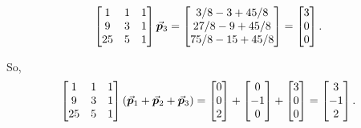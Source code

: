 \documentclass[MathsNotesBase.tex]{subfiles}
\begin{document}
{\begin{itemize}
{\[				\begin{bmatrix}
				1 & 1 & 1\\
				9 & 3 & 1\\
				25 & 5 & 1
				\end{bmatrix}
				\vec{\bm{p}}_3 =
				\begin{bmatrix}
				3/8 - 3 + 45/8\\
				27/8 - 9 + 45/8\\
				75/8 - 15 + 45/8
				\end{bmatrix} =
				\begin{bmatrix}3\\0\\0\end{bmatrix}.
			\]
		}
	\end{itemize}
	So,
	\[ \begin{bmatrix}
		1 & 1 & 1\\
		9 & 3 & 1\\
		25 & 5 & 1
		\end{bmatrix}
		(\vec{\bm{p}}_1 + \vec{\bm{p}}_2 + \vec{\bm{p}}_3)
		 = 
		\begin{bmatrix}0\\0\\2\end{bmatrix} + \begin{bmatrix}0\\-1\\0\end{bmatrix} + \begin{bmatrix}3\\0\\0\end{bmatrix}
		= 
		\begin{bmatrix}3\\-1\\2\end{bmatrix}.
	\]
}
\end{document}
